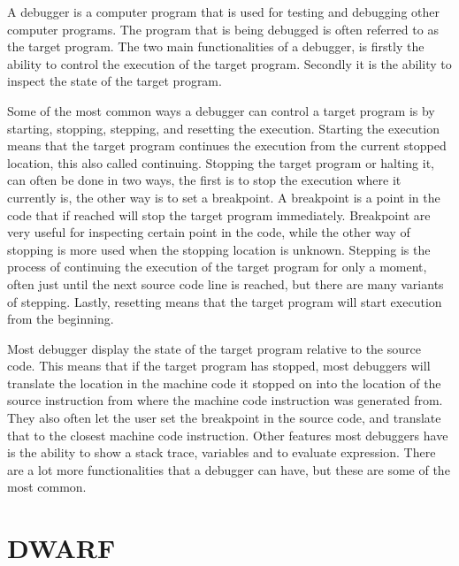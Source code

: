 

A debugger is a computer program that is used for testing and debugging other computer programs.
The program that is being debugged is often referred to as the target program.
The two main functionalities of a debugger, is firstly the ability to control the execution of the target program.
Secondly it is the ability to inspect the state of the target program.


Some of the most common ways a debugger can control a target program is by starting, stopping, stepping, and resetting the execution.
Starting the execution means that the target program continues the execution from the current stopped location, this also called continuing.
Stopping the target program or halting it, can often be done in two ways, the first is to stop the execution where it currently is, the other way is to set a breakpoint.
A breakpoint is a point in the code that if reached will stop the target program immediately.
Breakpoint are very useful for inspecting certain point in the code, while the other way of stopping is more used when the stopping location is unknown.
Stepping is the process of continuing the execution of the target program for only a moment, often just until the next source code line is reached, but there are many variants of stepping.
Lastly, resetting means that the target program will start execution from the beginning.


Most debugger display the state of the target program relative to the source code.
This means that if the target program has stopped, most debuggers will translate the location in the machine code it stopped on into the location of the source instruction from where the machine code instruction was generated from.
They also often let the user set the breakpoint in the source code, and translate that to the closest machine code instruction.
Other features most debuggers have is the ability to show a stack trace, variables and to evaluate expression.
There are a lot more functionalities that a debugger can have, but these are some of the most common.



\section{DWARF}
\label{sec:dwarf}
 
